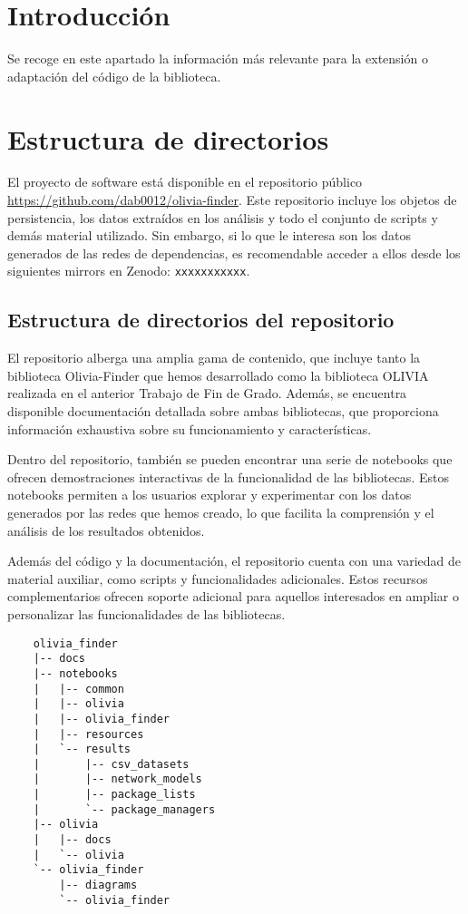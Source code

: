 
\section{Introducción}
Se recoge en este apartado la información más relevante para la extensión
o adaptación del código de la biblioteca.

\section{Estructura de directorios}
El proyecto de software está disponible en el repositorio público \url{https://github.com/dab0012/olivia-finder}.
Este repositorio incluye los objetos de persistencia, los datos extraídos en los análisis y todo el
conjunto de scripts y demás material utilizado. Sin embargo, si lo que le interesa son los datos generados de las redes de dependencias,
es recomendable acceder a ellos desde los siguientes mirrors en Zenodo: \texttt{xxxxxxxxxxx}.

\subsection{Estructura de directorios del repositorio}

El repositorio alberga una amplia gama de contenido, que incluye tanto la biblioteca Olivia-Finder que hemos
desarrollado como la biblioteca OLIVIA realizada en el anterior Trabajo de Fin de Grado. Además, se encuentra
disponible documentación detallada sobre ambas bibliotecas, que proporciona información exhaustiva sobre su
funcionamiento y características.

Dentro del repositorio, también se pueden encontrar una serie de notebooks que ofrecen demostraciones interactivas
de la funcionalidad de las bibliotecas. Estos notebooks permiten a los usuarios explorar y experimentar con los
datos generados por las redes que hemos creado, lo que facilita la comprensión y el análisis de los resultados
obtenidos.

Además del código y la documentación, el repositorio cuenta con una variedad de material auxiliar, como scripts
y funcionalidades adicionales. Estos recursos complementarios ofrecen soporte adicional para aquellos interesados
en ampliar o personalizar las funcionalidades de las bibliotecas.

\begin{verbatim}
    olivia_finder
    |-- docs
    |-- notebooks
    |   |-- common
    |   |-- olivia
    |   |-- olivia_finder
    |   |-- resources
    |   `-- results
    |       |-- csv_datasets
    |       |-- network_models
    |       |-- package_lists
    |       `-- package_managers
    |-- olivia
    |   |-- docs
    |   `-- olivia
    `-- olivia_finder
        |-- diagrams
        `-- olivia_finder
    \end{verbatim}
    

